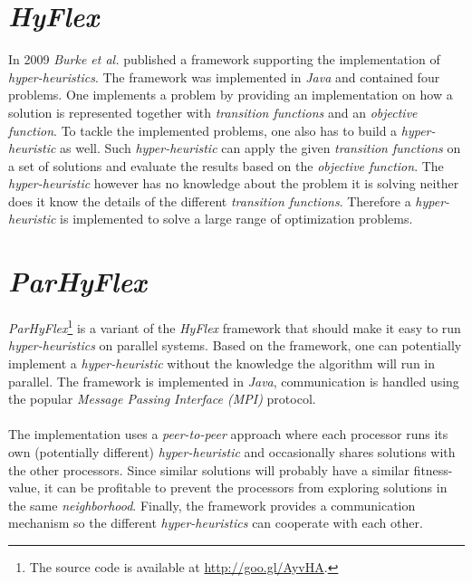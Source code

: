 \documentclass[a4paper,10pt]{article}
\newcommand{\seclab}[1]{\label{sec:#1}}
\theoremstyle{definition}
\begin{document}
\section{\emph{HyFlex}}
\seclab{hyflex}
In 2009 \emph{Burke et al.}\cite{} published a framework supporting the implementation of \emph{hyper-heuristics}. The framework was implemented in \emph{Java} and contained four problems. One implements a problem by providing an implementation on how a solution is represented together with \emph{transition functions} and an \emph{objective function}. To tackle the implemented problems, one also has to build a \emph{hyper-heuristic} as well. Such \emph{hyper-heuristic} can apply the given \emph{transition functions} on a set of solutions and evaluate the results based on the \emph{objective function}. The \emph{hyper-heuristic} however has no knowledge about the problem it is solving neither does it know the details of the different \emph{transition functions}. Therefore a \emph{hyper-heuristic} is implemented to solve a large range of optimization problems.

\section{\emph{ParHyFlex}}
\seclab{parhyflex}
\emph{ParHyFlex}\footnote{The source code is available at \url{http://goo.gl/AyvHA}.} is a variant of the \emph{HyFlex} framework that should make it easy to run \emph{hyper-heuristics} on parallel systems. Based on the framework, one can potentially implement a \emph{hyper-heuristic} without the knowledge the algorithm will run in parallel. The framework is implemented in \emph{Java}, communication is handled using the popular \emph{Message Passing Interface (MPI)} protocol.

\paragraph{}
The implementation uses a \emph{peer-to-peer} approach where each processor runs its own (potentially different) \emph{hyper-heuristic} and occasionally shares solutions with the other processors. Since similar solutions will probably have a similar fitness-value, it can be profitable to prevent the processors from exploring solutions in the same \emph{neighborhood}. Finally, the framework provides a communication mechanism so the different \emph{hyper-heuristics} can cooperate with each other.
\end{document}
